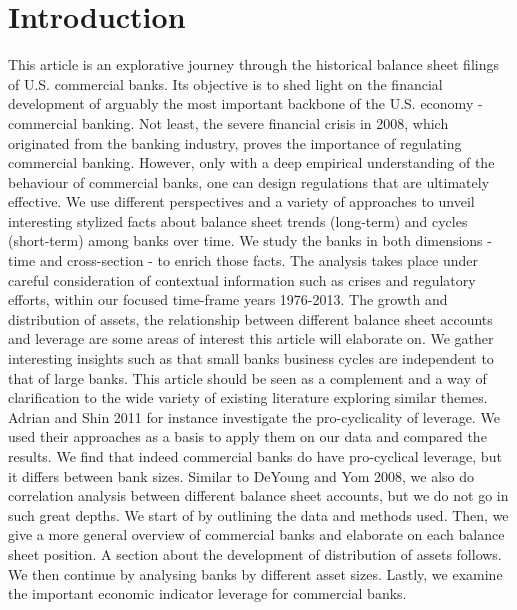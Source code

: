\documentclass[12pt, a4paper]{article} %
\begin{document}
\tableofcontents
\newpage
{}




\section{Introduction}

This article is an explorative journey through the historical balance sheet filings of U.S. commercial banks. Its objective is to shed light on the financial development of arguably the most important backbone of the U.S. economy - commercial banking. Not least, the severe financial crisis in 2008, which originated from the banking industry, proves the importance of regulating commercial banking. However, only with a deep empirical understanding of the behaviour of commercial banks, one can design regulations that are ultimately effective. We use different perspectives and a variety of approaches to unveil interesting stylized facts about balance sheet trends (long-term) and cycles (short-term) among banks over time. We study the banks in both dimensions - time and cross-section - to enrich those facts. The analysis takes place under careful consideration of contextual information such as crises and regulatory efforts, within our focused time-frame years 1976-2013. The growth and distribution of assets, the relationship between different balance sheet accounts and leverage are some areas of interest this article will elaborate on. We gather interesting insights such as that small banks business cycles are independent to that of large banks.  
This article should be seen as a complement and a way of clarification to the wide variety of existing literature exploring similar themes. Adrian and Shin 2011 for instance investigate the pro-cyclicality of leverage. We used their approaches as a basis to apply them on our data and compared the results. We find that indeed commercial banks do have pro-cyclical leverage, but it differs between bank sizes. Similar to DeYoung and Yom 2008, we also do correlation analysis between different balance sheet accounts, but we do not go in such great depths.
We start of by outlining the data and methods used. Then, we give a more general overview of commercial banks and elaborate on each balance sheet position. A section about the development of distribution of assets follows. We then continue by analysing banks by different asset sizes. Lastly, we examine the important economic indicator leverage for commercial banks.
\end{document}
